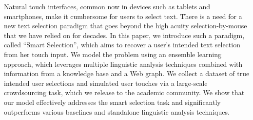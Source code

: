 Natural touch interfaces, common now in devices such as tablets and smartphones, make it cumbersome for users to select text. There is a need for a new text selection paradigm that goes beyond the high acuity selection-by-mouse that we have relied on for decades. In this paper, we introduce such a paradigm, called ``Smart Selection'', which aims to recover a user's intended text selection from her touch input. We model the problem using an ensemble learning approach, which leverages multiple linguistic analysis techniques combined with information from a knowledge base and a Web graph. We collect a dataset of true intended user selections and simulated user touches via a large-scale crowdsourcing task, which we release to the academic community. We show that our model effectively addresses the smart selection task and significantly outperforms various baselines and standalone linguistic analysis techniques.
